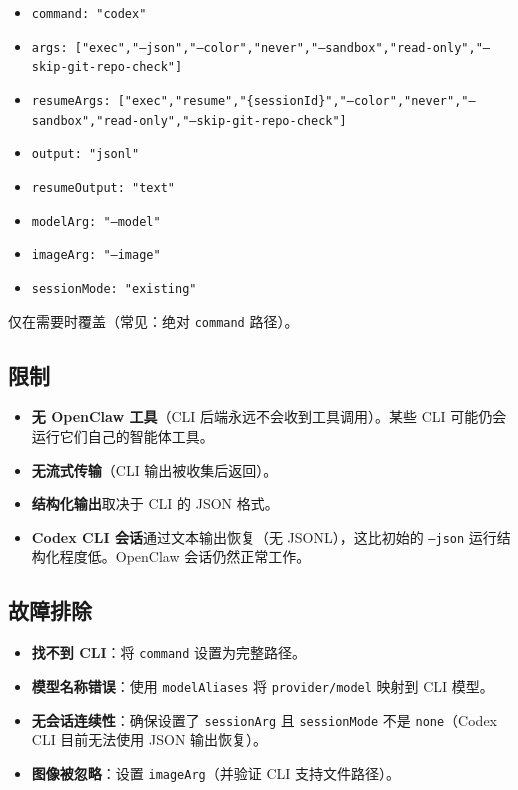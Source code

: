 \begin{itemize}
  \item \texttt{command: "codex"}
  \item \texttt{args: ["exec","--json","--color","never","--sandbox","read-only","--skip-git-repo-check"]}
  \item \texttt{resumeArgs: ["exec","resume","\{sessionId\}","--color","never","--sandbox","read-only","--skip-git-repo-check"]}
  \item \texttt{output: "jsonl"}
  \item \texttt{resumeOutput: "text"}
  \item \texttt{modelArg: "--model"}
  \item \texttt{imageArg: "--image"}
  \item \texttt{sessionMode: "existing"}
\end{itemize}


仅在需要时覆盖（常见：绝对 \texttt{command} 路径）。

\subsection{限制}


\begin{itemize}
  \item \textbf{无 OpenClaw 工具}（CLI 后端永远不会收到工具调用）。某些 CLI 可能仍会运行它们自己的智能体工具。
  \item \textbf{无流式传输}（CLI 输出被收集后返回）。
  \item \textbf{结构化输出}取决于 CLI 的 JSON 格式。
  \item \textbf{Codex CLI 会话}通过文本输出恢复（无 JSONL），这比初始的 \texttt{--json} 运行结构化程度低。OpenClaw 会话仍然正常工作。
\end{itemize}


\subsection{故障排除}


\begin{itemize}
  \item \textbf{找不到 CLI}：将 \texttt{command} 设置为完整路径。
  \item \textbf{模型名称错误}：使用 \texttt{modelAliases} 将 \texttt{provider/model} 映射到 CLI 模型。
  \item \textbf{无会话连续性}：确保设置了 \texttt{sessionArg} 且 \texttt{sessionMode} 不是 \texttt{none}（Codex CLI 目前无法使用 JSON 输出恢复）。
  \item \textbf{图像被忽略}：设置 \texttt{imageArg}（并验证 CLI 支持文件路径）。
\end{itemize}



